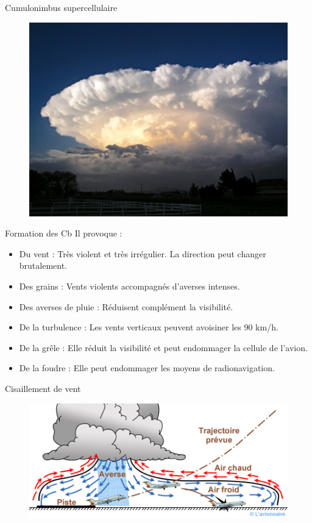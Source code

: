 \documentclass{beamer}
\begin{document}
\begin{frame}{Cumulonimbus supercellulaire}
  \begin{figure}
    \centering
    \includegraphics[scale=0.16]{images/Chaparral.jpg}
  \end{figure}
\end{frame}

\begin{frame}{Formation des Cb}
  Il provoque :
  \begin{itemize}
    \item Du vent : Très violent et très irrégulier. La direction peut changer brutalement. \pause
    \item Des grains : Vents violents accompagnés d'averses intenses. \pause
    \item Des averses de pluie : Réduisent complément la visibilité. \pause
    \item De la turbulence : Les vents verticaux peuvent avoisiner les 90 km/h. \pause
    \item De la grêle : Elle réduit la visibilité et peut endommager la cellule de l'avion. \pause
    \item De la foudre : Elle peut endommager les moyens de radionavigation.
  \end{itemize}
\end{frame}

\begin{frame}{Cisaillement de vent}
  \begin{figure}
    \centering
    \includegraphics[scale=0.7]{images/cisaillement.png}
  \end{figure}
\end{frame}
\end{document}
